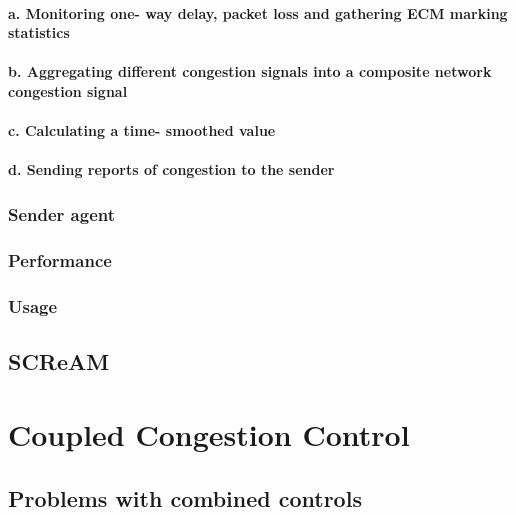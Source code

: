 \documentclass[UKenglish]{ifimaster}
\begin{document}
\paragraph{a. Monitoring one- way delay, packet loss and gathering ECM marking statistics}
\paragraph{b. Aggregating different congestion signals into a composite network congestion signal}
\paragraph{c. Calculating a time- smoothed value}
\paragraph{d. Sending reports of congestion to the sender}

\subsubsection{Sender agent}
\subsubsection{Performance}
\subsubsection{Usage}

\subsection{SCReAM}

\section{Coupled Congestion Control}
\subsection{Problems with combined controls}
\end{document}
